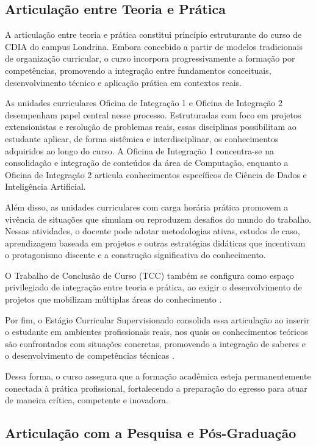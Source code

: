 \subsection{Articulação entre Teoria e Prática}

A articulação entre teoria e prática constitui princípio estruturante do curso de CDIA do campus Londrina. Embora concebido a partir de modelos tradicionais de organização curricular, o curso incorpora progressivamente a formação por competências, promovendo a integração entre fundamentos conceituais, desenvolvimento técnico e aplicação prática em contextos reais.

As unidades curriculares Oficina de Integração 1 e Oficina de Integração 2 desempenham papel central nesse processo. Estruturadas com foco em projetos extensionistas e resolução de problemas reais, essas disciplinas possibilitam ao estudante aplicar, de forma sistêmica e interdisciplinar, os conhecimentos adquiridos ao longo do curso. A Oficina de Integração 1 concentra-se na consolidação e integração de conteúdos da área de Computação, enquanto a Oficina de Integração 2 articula conhecimentos específicos de Ciência de Dados e Inteligência Artificial.

Além disso, as unidades curriculares com carga horária prática promovem a vivência de situações que simulam ou reproduzem desafios do mundo do trabalho. Nessas atividades, o docente pode adotar metodologias ativas, estudos de caso, aprendizagem baseada em projetos e outras estratégias didáticas que incentivam o protagonismo discente e a construção significativa do conhecimento.

O Trabalho de Conclusão de Curso (TCC) também se configura como espaço privilegiado de integração entre teoria e prática, ao exigir o desenvolvimento de projetos que mobilizam múltiplas áreas do conhecimento \cite{UTFPR_TCC_2018}.

Por fim, o Estágio Curricular Supervisionado consolida essa articulação ao inserir o estudante em ambientes profissionais reais, nos quais os conhecimentos teóricos são confrontados com situações concretas, promovendo a integração de saberes e o desenvolvimento de competências técnicas \cite{LDE_2008, Estagio_2020}.

Dessa forma, o curso assegura que a formação acadêmica esteja permanentemente conectada à prática profissional, fortalecendo a preparação do egresso para atuar de maneira crítica, competente e inovadora.

\subsection{Articulação com a Pesquisa e Pós-Graduação}

